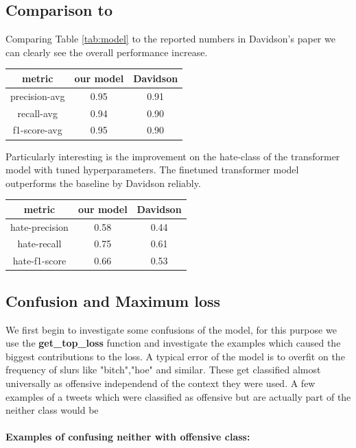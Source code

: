 \documentclass[11pt,a4paper]{article}
\begin{document}
\subsection{Comparison to \cite{auto_hatespeech}}
Comparing Table \ref{tab:model} to the reported numbers in Davidson's paper we can clearly see the overall performance increase.
\begin{table}[ht]
  \begin{tabular}{c | c  c}
    metric & our model & Davidson \\
    \hline
    precision-avg &  0.95 & 0.91 \\
    recall-avg &  0.94 & 0.90 \\  
    f1-score-avg &  0.95 & 0.90 \\
  \end{tabular}
\end{table}

Particularly interesting is the improvement on the hate-class of the transformer model with tuned hyperparameters.
The finetuned transformer model outperforms the baseline by Davidson reliably.

\begin{table}[ht]
  \begin{tabular}{c | c  c}
    metric & our model & Davidson \\
    \hline
    hate-precision &  0.58 & 0.44 \\
    hate-recall &  0.75 & 0.61 \\  
    hate-f1-score &  0.66 & 0.53 \\
  \end{tabular}
\end{table}

\subsection{Confusion and Maximum loss}
We first begin to investigate some confusions of the model, for this purpose we use the \textbf{get\_top\_loss} function and investigate the examples which
caused the biggest contributions to the loss.
A typical error of the model is to overfit on the frequency of slurs like "bitch","hoe" and similar.
These get classified almost universally as offensive independend of the context they were used.
A few examples of a tweets which were classified as offensive but are actually part of the neither class would be

\paragraph{Examples of confusing neither with offensive class:}
\begin{center}
   \newline
   \newline
   \newline
   \newline
\end{center}
\end{document}
